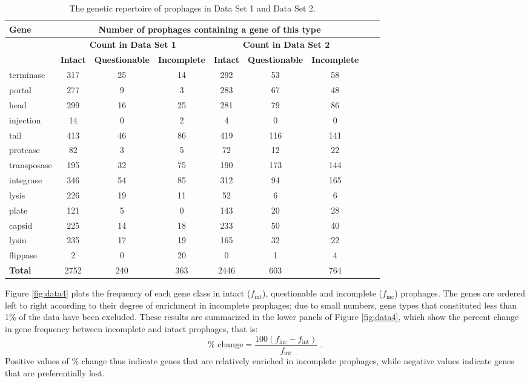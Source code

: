\renewcommand{\baselinestretch}{1}
\begin{table}
  \centering
  \renewcommand{\arraystretch}{2}
  \begin{tabular}{|p{2cm}|c|c|c|c|c|c|c|c|}
    \hline
    \multirow{3}{2cm}{\textbf{Gene}} & 
    \multicolumn{6}{c|}{\textbf{Number of prophages containing a gene of this type}}\\ \hline
    & \multicolumn{3}{|c|}{\textbf{Count in Data Set 1}} & \multicolumn{3}{c|}{\textbf{Count in Data Set 2}}\\
    \cline{2-7}  
    & \textbf{Intact} & \textbf{Questionable} & \textbf{Incomplete} & \textbf{Intact} & \textbf{Questionable} & \textbf{Incomplete}\\
    \hline
    terminase & 317 & 25 & 14 &292 &53 &58  \\ \hline
    portal & 277 & 9 & 3 &283   &67 &48  \\ \hline
    head & 299 & 16 & 25 &281  &79 &86  \\ \hline
    injection & 14 & 0 & 2 & 4 & 0 & 0 \\ \hline
    tail & 413 & 46 & 86 &419  &116 &141  \\ \hline
    protease & 82 & 3 & 5 &72  &12 &22  \\ \hline
    transposase & 195 & 32 & 75 & 190 & 173 & 144 \\ \hline
    integrase & 346 & 54 & 85 &  312 &94 & 165 \\ \hline
    lysis & 226 & 19 & 11 & 52 & 6 & 6  \\ \hline
    plate & 121 & 5 & 0 &143  & 20 & 28 \\ \hline
    capsid & 225 & 14 & 18 &233  & 50 & 40  \\ \hline
    lysin & 235 & 17 & 19 &165  & 32 &22  \\ \hline
    flippase & 2 & 0 & 20 & 0 & 1 & 4  \\ \hline \hline
    \textbf{Total} & 2752 & 240 & 363 & 2446 & 603 & 764  \\ \hline
  \end{tabular}
  \caption{ The genetic repertoire of prophages in Data Set 1 and Data Set 2.}
\label{tab:genes}
\end{table}
\renewcommand{\baselinestretch}{2}

Figure \ref{fig:data4} plots the frequency of each gene class in intact ($f_{\mbox{int}}$), questionable and incomplete ($f_{\mbox{inc}}$) prophages.  The genes are ordered left to right according to their degree of enrichment in incomplete prophages; due to small numbers, gene types that constituted less than 1\% of the data have been excluded.  These results are summarized in the lower panels of Figure \ref{fig:data4}, which show the percent change in gene frequency between incomplete and intact prophages, that is:
\[
\% \mbox{ change} = 
\frac{100 ( f_{\mbox{inc}} - f_{\mbox{int}} )}
{ f_{\mbox{int}} } \,\,.
\]
Positive values of \% change thus indicate genes that are relatively enriched in incomplete prophages, while negative values indicate genes that are preferentially lost.

